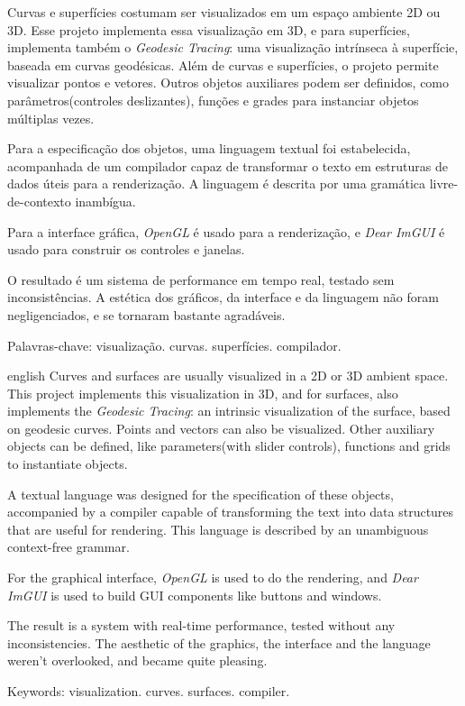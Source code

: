 \setlength{\absparsep}{18pt} 
\begin{resumo}[Resumo]
Curvas e superfícies costumam ser visualizados em um espaço ambiente 2D ou 3D.
Esse projeto implementa essa visualização em 3D, e para superfícies,
implementa também o \textit{Geodesic Tracing}: uma visualização intrínseca à
superfície, baseada em curvas geodésicas. Além de curvas e superfícies,
o projeto permite visualizar pontos e vetores. Outros objetos auxiliares podem ser
definidos, como parâmetros(controles deslizantes), funções e grades para
instanciar objetos múltiplas vezes.

Para a especificação dos objetos, uma linguagem textual foi estabelecida,
acompanhada de um compilador capaz de transformar o texto em estruturas de dados
úteis para a renderização. A linguagem é descrita por uma gramática livre-de-contexto
inambígua.

Para a interface gráfica, \textit{OpenGL} é usado para a renderização,
e \textit{Dear ImGUI} é usado para construir os controles e janelas.

O resultado é um sistema de performance em tempo real, testado sem
inconsistências. A estética dos gráficos, da interface e da
linguagem não foram negligenciados, e se tornaram bastante agradáveis.

 Palavras-chave: visualização. curvas. superfícies. compilador.
\end{resumo}

\begin{resumo}[Abstract]
\begin{otherlanguage*}{english}
Curves and surfaces are usually visualized in a 2D or 3D ambient space.
This project implements this visualization in 3D, and for surfaces, also
implements the \textit{Geodesic Tracing}: an intrinsic visualization of the surface,
based on geodesic curves. Points and vectors can also be visualized.
Other auxiliary objects can be defined, like parameters(with slider controls),
functions and grids to instantiate objects.

A textual language was designed for the specification of these objects,
accompanied by a compiler capable of transforming the text into data structures
that are useful for rendering. This language is described by an unambiguous context-free grammar.

For the graphical interface, \textit{OpenGL} is used to do the rendering,
and \textit{Dear ImGUI} is used to build GUI components like buttons and windows.

The result is a system with real-time performance, tested without any inconsistencies.
The aesthetic of the graphics, the interface and the language weren't
overlooked, and became quite pleasing.

 Keywords: visualization. curves. surfaces. compiler.
\end{otherlanguage*}
\end{resumo}